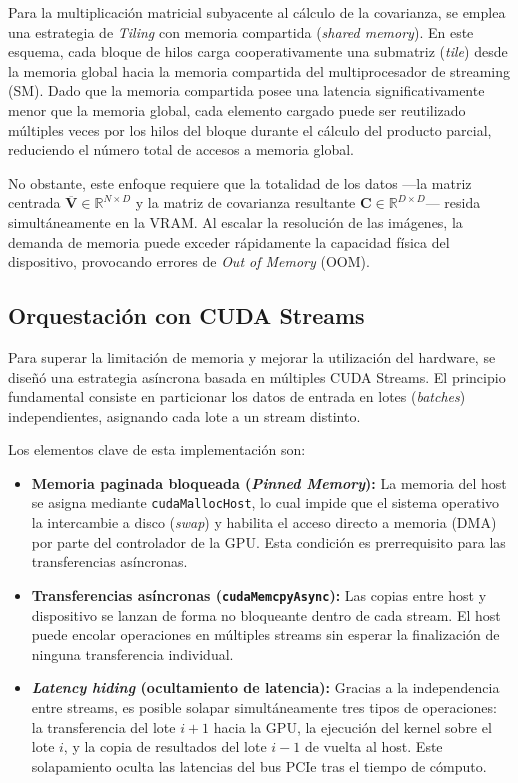 \documentclass[12pt, a4paper]{article}
\begin{document}
Para la multiplicación matricial subyacente al cálculo de la covarianza, se
emplea una estrategia de \textit{Tiling} con memoria compartida
(\textit{shared memory}). En este esquema, cada bloque de hilos carga
cooperativamente una submatriz (\textit{tile}) desde la memoria global hacia
la memoria compartida del multiprocesador de streaming (SM). Dado que la
memoria compartida posee una latencia significativamente menor que la memoria
global, cada elemento cargado puede ser reutilizado múltiples veces por los
hilos del bloque durante el cálculo del producto parcial, reduciendo el
número total de accesos a memoria global.

No obstante, este enfoque requiere que la totalidad de los datos ---la matriz
centrada $\overline{\mathbf{V}} \in \mathbb{R}^{N \times D}$ y la matriz de
covarianza resultante $\mathbf{C} \in \mathbb{R}^{D \times D}$--- resida
simultáneamente en la VRAM. Al escalar la resolución de las imágenes, la
demanda de memoria puede exceder rápidamente la capacidad física del
dispositivo, provocando errores de \textit{Out of Memory} (OOM).

\subsection{Orquestación con CUDA Streams}

Para superar la limitación de memoria y mejorar la utilización del hardware,
se diseñó una estrategia asíncrona basada en múltiples CUDA Streams. El
principio fundamental consiste en particionar los datos de entrada en lotes
(\textit{batches}) independientes, asignando cada lote a un stream distinto.

Los elementos clave de esta implementación son:

\begin{itemize}
    \item \textbf{Memoria paginada bloqueada (\textit{Pinned Memory}):}
    La memoria del host se asigna mediante \texttt{cudaMallocHost}, lo cual
    impide que el sistema operativo la intercambie a disco (\textit{swap}) y
    habilita el acceso directo a memoria (DMA) por parte del controlador de la
    GPU. Esta condición es prerrequisito para las transferencias asíncronas.

    \item \textbf{Transferencias asíncronas (\texttt{cudaMemcpyAsync}):}
    Las copias entre host y dispositivo se lanzan de forma no bloqueante dentro
    de cada stream. El host puede encolar operaciones en múltiples streams sin
    esperar la finalización de ninguna transferencia individual.

    \item \textbf{\textit{Latency hiding} (ocultamiento de latencia):}
    Gracias a la independencia entre streams, es posible solapar
    simultáneamente tres tipos de operaciones: la transferencia del lote $i+1$
    hacia la GPU, la ejecución del kernel sobre el lote $i$, y la copia de
    resultados del lote $i-1$ de vuelta al host. Este solapamiento oculta las
    latencias del bus PCIe tras el tiempo de cómputo.
\end{itemize}
\end{document}
